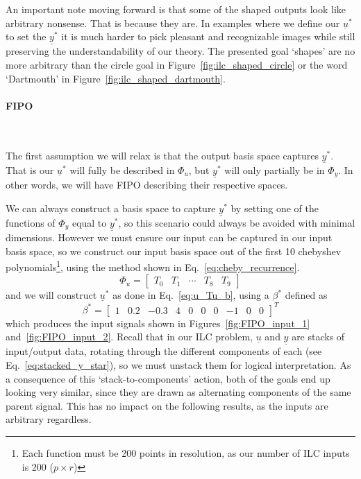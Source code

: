 An important note moving forward is that some of the shaped outputs look like arbitrary nonsense. That is because they are. In examples where we define our $\underline{u}^\ast$ to set the $\underline{y}^\ast$ it is much harder to pick pleasant and recognizable images while still preserving the understandability of our theory. The presented goal `shapes' are no more arbitrary than the circle goal in Figure~\ref{fig:ilc_shaped_circle} or the word `Dartmouth' in Figure~\ref{fig:ilc_shaped_dartmouth}. 

\FloatBarrier\paragraph{{FIPO}}
~\label{par:fipo}

The first assumption we will relax is that the output basis space captures $\underline{y}^\ast$. That is our $\underline{u}^\ast$ will fully be described in $\Phi_u$, but $\underline{y}^\ast$ will only partially be in $\Phi_y$. In other words, we will have \ac{FIPO} describing their respective spaces.

We can always construct a basis space to capture $\underline{y}^\ast$ by setting one of the functions of $\Phi_y$ equal to $\underline{y}^\ast$, so this scenario could always be avoided with minimal dimensions. However we must ensure our input can be captured in our input basis space, so we construct our input basis space out of the first 10 chebyshev polynomials\footnote{Each function must be 200 points in resolution,  as our number of ILC inputs is 200 ($p \times r$)}, using the method shown in Eq.~\ref{eq:cheby_recurrence}.
\begin{equation}
    \Phi_u = 
    \begin{bmatrix}
        T_0 & T_1 & \cdots & T_8 & T_9
    \end{bmatrix}
    \label{eq:Tu_in_cheby}
\end{equation}
and we will construct $\underline{u}^\ast$ as done in Eq.~\ref{eq:u_Tu_b}, using a $\beta^\ast$ defined as
\begin{equation}
    \beta^\ast = {\begin{bmatrix}1 & 0.2 & -0.3 & 4 & 0 & 0 & 0 & -1 & 0 & 0\end{bmatrix}}^T
    \label{eq:beta_star_in_basis}
\end{equation}
which produces the input signals shown in Figures~\ref{fig:FIPO_input_1} and~\ref{fig:FIPO_input_2}. Recall that in our ILC problem, $\underline{u}$ and $\underline{y}$ are stacks of input/output data, rotating through the different components of each (see Eq.~\ref{eq:stacked_y_star}), so we must unstack them for logical interpretation. As a consequence of this `stack-to-components' action, both of the goals end up looking very similar, since they are drawn as alternating components of the same parent signal. This has no impact on the following results, as the inputs are arbitrary regardless.

